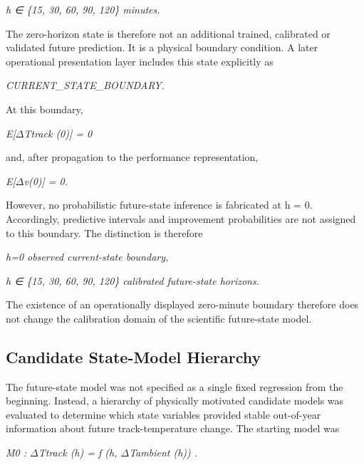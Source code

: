\begin{center}\textit{h ∈ \{15, 30, 60, 90, 120\} minutes.}\end{center}

The zero-horizon state is therefore not an additional trained, calibrated or validated future prediction. It is a physical boundary condition. A later operational presentation layer includes this state explicitly as

\begin{center}\textit{CURRENT\_STATE\_BOUNDARY.}\end{center}

At this boundary,

\begin{center}\textit{E[\ensuremath{\Delta}Ttrack (0)] = 0}\end{center}

and, after propagation to the performance representation,

\begin{center}\textit{E[\ensuremath{\Delta}v(0)] = 0.}\end{center}

However, no probabilistic future-state inference is fabricated at h = 0. Accordingly, predictive intervals and improvement probabilities are not assigned to this boundary. The distinction is therefore

\begin{center}\textit{h=0                         observed current-state boundary,}\end{center}

\begin{center}\textit{h ∈ \{15, 30, 60, 90, 120\}   calibrated future-state horizons.}\end{center}

The existence of an operationally displayed zero-minute boundary therefore does not change the calibration domain of the scientific future-state model.

\subsection{Candidate State-Model Hierarchy}
The future-state model was not specified as a single fixed regression from the beginning. Instead, a hierarchy of physically motivated candidate models was evaluated to determine which state variables provided stable out-of-year information about future track-temperature change. The starting model was

\begin{center}\textit{M0 :      \ensuremath{\Delta}Ttrack (h) = f (h, \ensuremath{\Delta}Tambient (h)) .}\end{center}

